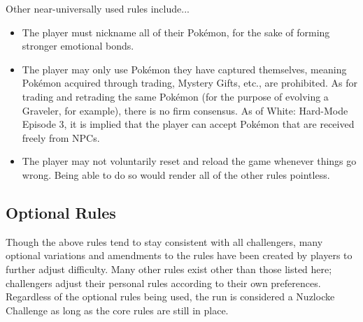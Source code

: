 \documentclass{article}
\begin{document}
		\noindent Other near-universally used rules include...

			\begin{itemize}
				\item 
					The player must nickname all of their Pokémon, for the sake of forming stronger emotional bonds.
				\item
					The player may only use Pokémon they have captured themselves, meaning Pokémon acquired through trading, Mystery Gifts, etc., are prohibited. As for trading and retrading the same Pokémon (for the purpose of evolving a Graveler, for example), there is no firm consensus. As of White: Hard-Mode Episode 3, it is implied that the player can accept Pokémon that are received freely from NPCs.
				\item 
					The player may not voluntarily reset and reload the game whenever things go wrong. Being able to do so would render all of the other rules pointless.
			\end{itemize}


	\subsection{Optional Rules}
	\renewcommand{\labelitemi}{$\square$}

		Though the above rules tend to stay consistent with all challengers, many optional variations and amendments to the rules have been created by players to further adjust difficulty. Many other rules exist other than those listed here; challengers adjust their personal rules according to their own preferences. Regardless of the optional rules being used, the run is considered a Nuzlocke Challenge as long as the core rules are still in place.
\end{document}
